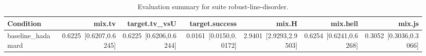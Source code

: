 \begin{table}[t]
\centering
\caption{Evaluation summary for suite robust-line-disorder.}
\label{tab:eval_robust-line-disorder}
\begin{tabular}{lrrrrrr}
\toprule
Condition & mix.tv & target.tv\_vsU & target.success & mix.H & mix.hell & mix.js \\
\midrule
baseline\_hadamard & 0.6225~[0.6207,0.6245] & 0.6225~[0.6206,0.6244] & 0.0161~[0.0150,0.0172] & 2.9401~[2.9293,2.9503] & 0.6254~[0.6241,0.6268] & 0.3052~[0.3036,0.3066] \\
\bottomrule
\end{tabular}
\end{table}
